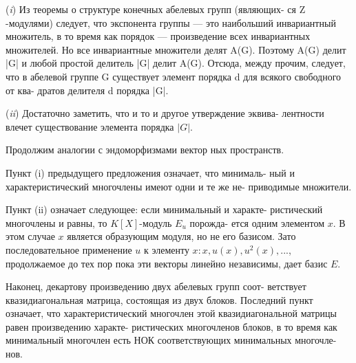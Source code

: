 \begin{myproof}
\par \quad\;  (\textit{i}) Из теоремы о структуре конечных абелевых групп (являющих­-\linebreak
ся Z -модулями) следует, что экспонента группы — это наибольший\linebreak
инвариантный множитель, в то время как порядок — произведение\linebreak
всех инвариантных множителей. Но все инвариантные множители\linebreak
делят A(G). Поэтому A(G) делит |G| и любой простой делитель |G|\linebreak
делит A(G). Отсюда, между прочим, следует, что в абелевой группе\linebreak
G существует элемент порядка d для всякого свободного от ква-\linebreak­
дратов делителя d порядка |G|.
\par  (\textit{ii}) Достаточно заметить, что и то и другое утверждение эквива­-\linebreak
лентности влечет существование элемента порядка $|G|$.
\end{myproof}
\newpage
\begin{mynotice}
Продолжим аналогии с эндоморфизмами вектор­
ных пространств.

Пункт (i) предыдущего предложения означает, что минималь-\linebreak­
ный и характеристический многочлены имеют одни и те же не­-\linebreak
приводимые множители.

Пункт (ii) означает следующее: если минимальный и характе-\linebreak­
ристический многочлены и равны, то $K[X]$-модуль $E_u$ порожда­-\linebreak
ется одним элементом $x$. В этом случае $x$ является образующим\linebreak
модуля, но не его базисом. Зато последовательное применение $u$\linebreak
к элементу $x: x, u(x), u^2(x),...$, продолжаемое до тех пор пока\linebreak
эти векторы линейно независимы, дает базис $E$.

Наконец, декартову произведению двух абелевых групп соот­-\linebreak
ветствует квазидиагональная матрица, состоящая из двух блоков.\linebreak
Последний пункт означает, что характеристический многочлен\linebreak
этой квазидиагональной матрицы равен произведению характе­-\linebreak
ристических многочленов блоков, в то время как минимальный\linebreak
многочлен есть НОК соответствующих минимальных многочле­-\linebreak
нов.
\end{mynotice}
